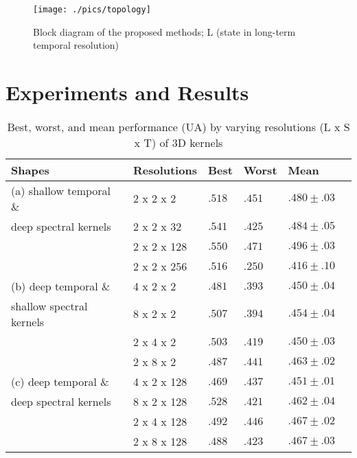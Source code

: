 \documentclass[conference, compsoc, twoside]{IEEEtran}
\begin{document}
\begin{figure}[!t]
\begin{minipage}[b]{1.0\linewidth}
  \centering
  \centerline{\texttt{[image: ./pics/topology]}}
\end{minipage}
\caption{Block diagram of the proposed methods; L (state in long-term temporal resolution)}
\label{fig:topology}
\end{figure}

\section{Experiments and Results}\label{sec:result}
\begin{table}[!th]
\centering
\begin{tabular}{llllll}
\hline
Shapes & Resolutions     & Best & Worst & Mean \\
\hline
(a) shallow temporal \& & 2 x 2 x 2          & $.518$   & $.451$ & $.480\pm.03$ \\
deep spectral kernels   & 2 x 2 x 32         & $.541$   & $.425$ & $.484\pm.05$ \\
                        & 2 x 2 x 128        & $.550$   & $.471$ & $\mathbf{.496\pm.03}$ \\    
                        & 2 x 2 x 256        & $.516$   & $.250$ & $.416\pm.10$ \\    
\hline
(b) deep temporal \&  & 4 x 2 x 2          & $.481$   & $.393$ & $.450\pm.04$ \\
shallow spectral kernels & 8 x 2 x 2          & $.507$   & $.394$ & $.454\pm.04$ \\
                             & 2 x 4 x 2          & $.503$   & $.419$ & $.450\pm.03$ \\
                             & 2 x 8 x 2          & $.487$   & $.441$ & $\mathbf{.463\pm.02}$ \\
\hline
(c) deep temporal \& & 4 x 2 x 128        & $.469$   & $.437$ & $.451\pm.01$ \\   
deep spectral kernels     & 8 x 2 x 128        & $.528$   & $.421$ & $.462\pm.04$ \\   
                     & 2 x 4 x 128        & $.492$   & $.446$ & $\mathbf{.467\pm.02}$ \\   
                     & 2 x 8 x 128        & $.488$   & $.423$ & $.467\pm.03$ \\
\hline
\end{tabular}
\vspace{0.15cm}
\caption{Best, worst, and mean performance (UA) by varying resolutions (L x S x T) of 3D kernels}\label{tab:resolution}
\end{table}
\end{document}
